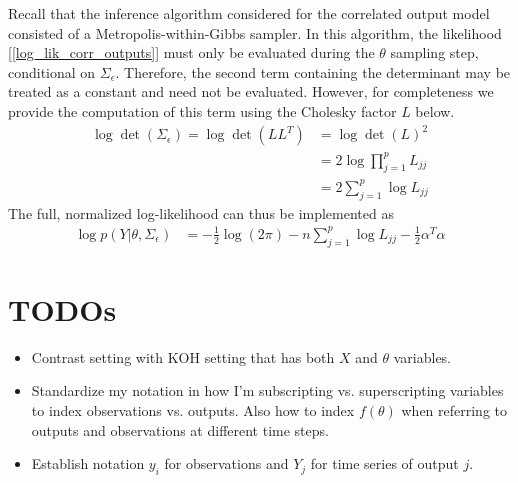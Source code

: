 \documentclass[12pt]{article}
\begin{document}
Recall that the inference algorithm considered for the correlated output model consisted of a Metropolis-within-Gibbs sampler. In this algorithm, the likelihood 
[\ref{log_lik_corr_outputs}] must only be evaluated during the $\theta$ sampling step, conditional on $\Sigma_\epsilon$. Therefore, the second term containing the 
determinant may be treated as a constant and need not be evaluated. However, for completeness we provide the computation of this term using the Cholesky 
factor $L$ below. 
\begin{align}
\log \det(\Sigma_\epsilon) = \log \det(LL^T) &= \log \det(L)^2 \\
								  &= 2 \log \prod_{j = 1}^{p} L_{jj} \\
								  &= 2 \sum_{j = 1}^{p} \log L_{jj}
\end{align}
The full, normalized log-likelihood can thus be implemented as
\begin{align}
\log p(Y|\theta, \Sigma_\epsilon) &= -\frac{1}{2} \log(2\pi) - n\sum_{j = 1}^{p} \log L_{jj}  - \frac{1}{2} \alpha^T \alpha
\end{align}


\section{TODOs}
\begin{itemize}
\item Contrast setting with KOH setting that has both $X$ and $\theta$ variables. 
\item Standardize my notation in how I'm subscripting vs. superscripting variables to index observations vs. outputs. Also how to 
index $f(\theta)$ when referring to outputs and observations at different time steps. 
\item Establish notation $y_i$ for observations and $Y_j$ for time series of output $j$. 
\end{itemize}
\end{document}
